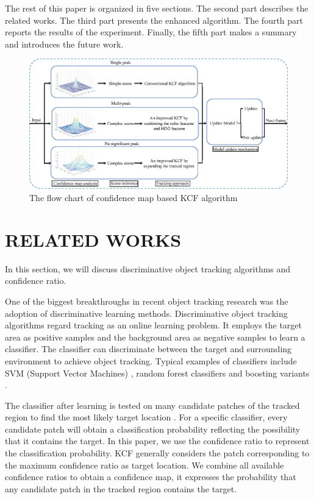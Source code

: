 \documentclass[conference]{IEEEtran}
\begin{document}
The rest of this paper is organized in five sections. The second part describes the related works. The third part presents the enhanced algorithm. The fourth part reports the results of the experiment. Finally, the fifth part makes a summary and introduces the future work.
\begin{figure}[htbp]
	\centering
	\includegraphics[scale=1]{flow.eps}
	\caption{The flow chart of confidence map based KCF algorithm}
	\label{fig:flow}
\end{figure}

\section{RELATED WORKS}
In this section, we will discuss discriminative object tracking algorithms and confidence ratio.

One of the biggest breakthroughs in recent object tracking research was the adoption of discriminative learning methods. 
Discriminative object tracking algorithms regard tracking as an online learning problem.
It employs the target area as positive samples and the background area as negative samples to learn a classifier.
The classifier can discriminate between the target and surrounding environment to achieve object tracking.
Typical examples of classifiers include SVM (Support Vector Machines) \cite{SVM}, random forest classifiers \cite{Randomforest} and boosting variants \cite{Boosting}.

The classifier after learning is tested on many candidate patches of the tracked region to find the most likely target location \cite{confidencemap}. 
For a specific classifier, every candidate patch will obtain a classification probability reflecting the possibility that it contains the target. 
In this paper, we use the confidence ratio to represent the classification probability.
KCF generally considers the patch corresponding to the maximum confidence ratio as target location.
We combine all available confidence ratios to obtain a confidence map, it expresses the probability that any candidate patch in the tracked region contains the target.
\end{document}
